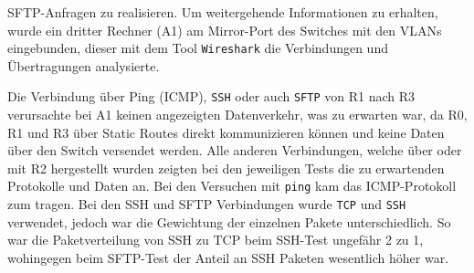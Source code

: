 \documentclass[11pt,a4paper]{article}
\begin{document}
SFTP-Anfragen zu realisieren. Um weitergehende Informationen zu
erhalten, wurde ein dritter Rechner (A1) am Mirror-Port des Switches
mit den VLANs eingebunden, dieser mit dem Tool \texttt{Wireshark} die
Verbindungen und Übertragungen analysierte.
\par
Die Verbindung über Ping (ICMP), \texttt{SSH} oder auch \texttt{SFTP}
von R1 nach R3 verursachte bei A1 keinen angezeigten Datenverkehr, was
zu erwarten war, da R0, R1 und R3 über Static Routes direkt
kommunizieren können und keine Daten über den Switch versendet werden.
Alle anderen Verbindungen, welche über oder mit R2 hergestellt wurden
zeigten bei den jeweiligen Tests die zu erwartenden Protokolle und
Daten an. Bei den Versuchen mit \texttt{ping} kam das ICMP-Protokoll
zum tragen. Bei den SSH und SFTP Verbindungen wurde \texttt{TCP} und
\texttt{SSH} verwendet, jedoch war die Gewichtung der einzelnen Pakete
unterschiedlich. So war die Paketverteilung von SSH zu TCP beim
SSH-Test ungefähr 2 zu 1, wohingegen beim SFTP-Test der Anteil an SSH
Paketen wesentlich höher war.
\end{document}

